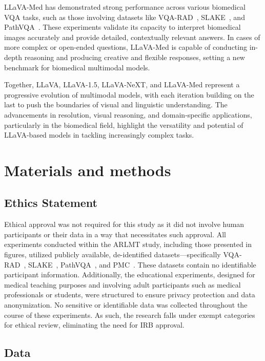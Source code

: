 \documentclass[10pt,letterpaper]{article}
\begin{document}
LLaVA-Med has demonstrated strong performance across various biomedical VQA tasks, such as those involving datasets like VQA-RAD~\cite{lau2018dataset}, SLAKE~\cite{liu2021slake}, and PathVQA~\cite{he2020pathvqa}. These experiments validate its capacity to interpret biomedical images accurately and provide detailed, contextually relevant answers. In cases of more complex or open-ended questions, LLaVA-Med is capable of conducting in-depth reasoning and producing creative and flexible responses, setting a new benchmark for biomedical multimodal models.

Together, LLaVA, LLaVA-1.5, LLaVA-NeXT, and LLaVA-Med represent a progressive evolution of multimodal models, with each iteration building on the last to push the boundaries of visual and linguistic understanding. The advancements in resolution, visual reasoning, and domain-specific applications, particularly in the biomedical field, highlight the versatility and potential of LLaVA-based models in tackling increasingly complex tasks.

\section*{Materials and methods}

\subsection*{Ethics Statement}

Ethical approval was not required for this study as it did not involve human participants or their data in a way that necessitates such approval. All experiments conducted within the ARLMT study, including those presented in figures, utilized publicly available, de-identified datasets—specifically VQA-RAD~\cite{lau2018dataset}, SLAKE~\cite{liu2021slake}, PathVQA~\cite{he2020pathvqa}, and PMC~\cite{lin2023pmc}. These datasets contain no identifiable participant information. Additionally, the educational experiments, designed for medical teaching purposes and involving adult participants such as medical professionals or students, were structured to ensure privacy protection and data anonymization. No sensitive or identifiable data was collected throughout the course of these experiments. As such, the research falls under exempt categories for ethical review, eliminating the need for IRB approval.

\subsection*{Data}
\end{document}
